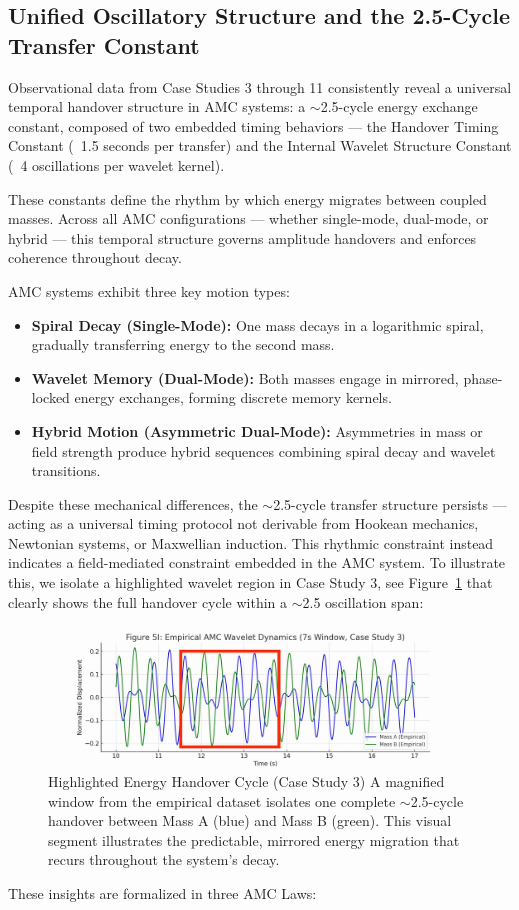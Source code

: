 \documentclass[10pt,aps,pre,onecolumn,superscriptaddress,notitlepage]{revtex4-2}
\begin{document}
\clearpage
\subsection{Unified Oscillatory Structure and the 2.5-Cycle Transfer Constant}
\label{sec:Unified}

Observational data from Case Studies 3 through 11 consistently reveal a universal temporal handover structure in AMC systems: a $\sim$2.5-cycle energy exchange constant, composed of two embedded timing behaviors — the Handover Timing Constant (~1.5 seconds per transfer) and the Internal Wavelet Structure Constant (~4 oscillations per wavelet kernel).

These constants define the rhythm by which energy migrates between coupled masses. Across all AMC configurations — whether single-mode, dual-mode, or hybrid — this temporal structure governs amplitude handovers and enforces coherence throughout decay.

AMC systems exhibit three key motion types:

\begin{itemize}
    \item \textbf{Spiral Decay (Single-Mode):} One mass decays in a logarithmic spiral, gradually transferring energy to the second mass.
    \item \textbf{Wavelet Memory (Dual-Mode):} Both masses engage in mirrored, phase-locked energy exchanges, forming discrete memory kernels.
    \item \textbf{Hybrid Motion (Asymmetric Dual-Mode):} Asymmetries in mass or field strength produce hybrid sequences combining spiral decay and wavelet transitions.
\end{itemize}
Despite these mechanical differences, the $\sim$2.5-cycle transfer structure persists — acting as a universal timing protocol not derivable from Hookean mechanics, Newtonian systems, or Maxwellian induction. This rhythmic constraint instead indicates a field-mediated constraint embedded in the AMC system.
To illustrate this, we isolate a highlighted wavelet region in Case Study 3, see Figure~\ref{fig:handover} that clearly shows the full handover cycle within a $\sim$2.5 oscillation span:

\begin{figure}[htbp]
  \centering
  \includegraphics[width=0.6\linewidth]{figures/Figure_5I_CaseStudy3_Empirical_Only sectioned 1.jpg}
  \caption{Highlighted Energy Handover Cycle (Case Study 3) 
  A magnified window from the empirical dataset isolates one complete $\sim$2.5-cycle handover between Mass A (blue) and Mass B (green). This visual segment illustrates the predictable, mirrored energy migration that recurs throughout the system’s decay.}
  \label{fig:handover}
\end{figure}
These insights are formalized in three AMC Laws:
\end{document}
